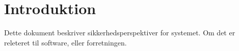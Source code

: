 \chapter{Introduktion}

Dette dokument beskriver sikkerhedsperspektiver for systemet. Om det er releteret til software, eller forretningen.



